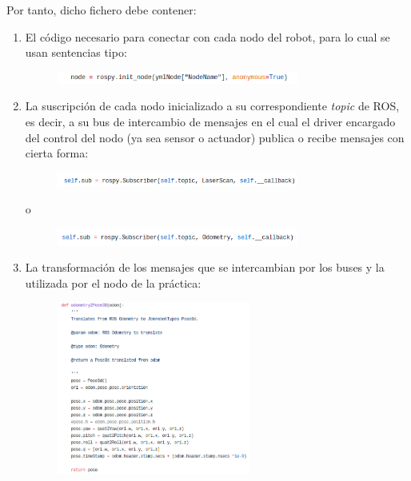 Por tanto, dicho fichero debe contener:
\begin{enumerate}
	\item El código necesario para conectar con cada nodo del robot, para lo cual se usan sentencias tipo:
	\begin{figure}[H]
	\begin{center}
		\includegraphics[width=0.75\textwidth]{figures/initnode.png}
		\label{fig.initnode}
		\end{center}
	\end{figure}
	\item La suscripción de cada nodo inicializado a su correspondiente \textit{topic} de ROS, es decir, a su bus de intercambio de mensajes en el cual el driver encargado del control del nodo (ya sea sensor o actuador) publica o recibe mensajes con cierta forma:
	\begin{figure}[H]
	\begin{center}
		\includegraphics[width=0.75\textwidth]{figures/subscriberlaser.png}
		\label{fig.subscriberlaser}
		\end{center}
	\end{figure}
	\hspace{0.48\linewidth}o
	\begin{figure}[H]
	\begin{center}
		\includegraphics[width=0.75\textwidth]{figures/subscriberodometry.png}
		\label{fig.subscriberodometry}
		\end{center}
	\end{figure}
	\item La transformación de los mensajes que se intercambian por los buses y la utilizada por el nodo de la práctica:
	\begin{figure}[H]
	\begin{center}
		\includegraphics[width=0.60\textwidth]{figures/odom2pose.png}
		\label{fig.odometry2pose}
		\end{center}
	\end{figure}
\end{enumerate}

